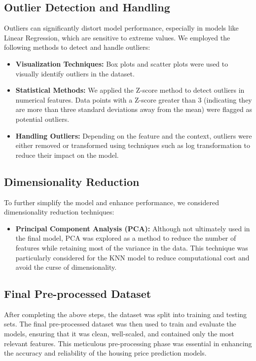 \documentclass[10pt,conference,compsoc]{IEEEtran}
\begin{document}
{\subsection{Outlier Detection and Handling}
Outliers can significantly distort model performance, especially in models like Linear Regression, which are sensitive to extreme values. We employed the following methods to detect and handle outliers:
\begin{itemize}
    \item \textbf{Visualization Techniques:} Box plots and scatter plots were used to visually identify outliers in the dataset.
    \item \textbf{Statistical Methods:} We applied the Z-score method to detect outliers in numerical features. Data points with a Z-score greater than 3 (indicating they are more than three standard deviations away from the mean) were flagged as potential outliers.
    \item \textbf{Handling Outliers:} Depending on the feature and the context, outliers were either removed or transformed using techniques such as log transformation to reduce their impact on the model.
\end{itemize}

\subsection{Dimensionality Reduction}
To further simplify the model and enhance performance, we considered dimensionality reduction techniques:
\begin{itemize}
    \item \textbf{Principal Component Analysis (PCA):} Although not ultimately used in the final model, PCA was explored as a method to reduce the number of features while retaining most of the variance in the data. This technique was particularly considered for the KNN model to reduce computational cost and avoid the curse of dimensionality.
\end{itemize}

\subsection{Final Pre-processed Dataset}
After completing the above steps, the dataset was split into training and testing sets. The final pre-processed dataset was then used to train and evaluate the models, ensuring that it was clean, well-scaled, and contained only the most relevant features. This meticulous pre-processing phase was essential in enhancing the accuracy and reliability of the housing price prediction models.


}
\end{document}
